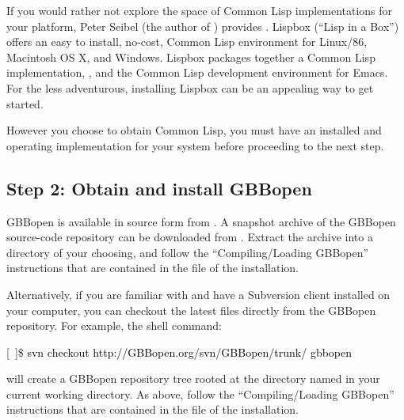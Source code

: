 \documentclass[10pt,twoside,english,pdftex]{article}
\begin{document}
If you would rather not explore the space of Common Lisp implementations for
your platform, Peter Seibel (the author of ) provides
.  Lispbox
(``Lisp in a Box'') offers an easy to install, no-cost, Common Lisp
environment for Linux/86, Macintosh OS X, and Windows.  Lispbox packages
together a Common Lisp implementation,
, and the
 Common Lisp
development environment for Emacs.  For the less adventurous, installing
Lispbox can be an appealing way to get started.

However you choose to obtain Common Lisp, you must have an installed and
operating implementation for your system before proceeding to the next step.

\subsection*{Step 2: Obtain and install GBBopen}

%
%
GBBopen is available in source form from
.  A
snapshot archive of the GBBopen source-code repository can be downloaded from
.
Extract the archive into a directory of your choosing, and follow the
``Compiling/Loading GBBopen'' instructions that are contained in the
 file of the installation.

%
%
Alternatively, if you are familiar with
 and have a Subversion
client installed on your computer, you can checkout the latest files directly
from the GBBopen repository.  For example, the shell command:
%
\W\supp
\begin{example}
\textcolor{darkergray}{%
  [~]\$ \textcolor{black}{svn checkout http://GBBopen.org/svn/GBBopen/trunk/ gbbopen}}
\end{example}
%
will create a GBBopen repository tree rooted at the directory named
 in your current working directory.  As above, follow the
``Compiling/Loading GBBopen'' instructions that are contained in the
 file of the installation.
\end{document}
